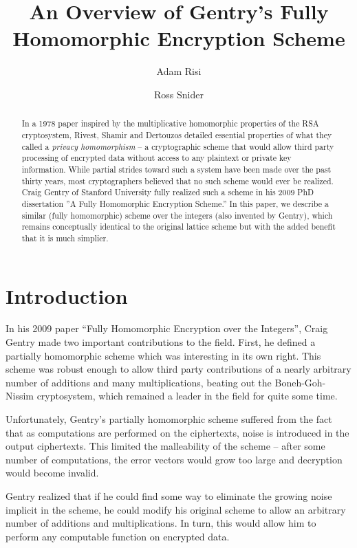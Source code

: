 \documentclass[a4paper,10pt]{article}
\title{An Overview of Gentry's Fully Homomorphic Encryption Scheme}
\author{Adam Risi \and Ross Snider}
\begin{document}
\maketitle
\titlepage
\tableofcontents
\pagebreak

\begin{abstract}
  In a 1978 paper\cite{rad-priv} inspired by the multiplicative
  homomorphic properties of the RSA cryptosystem, Rivest, Shamir and
  Dertouzos detailed essential properties of what they called a
  \textit{privacy homomorphism} -- a cryptographic scheme that would
  allow third party processing of encrypted data without access to any
  plaintext or private key information. While partial strides toward
  such a system have been made over the past thirty years, most
  cryptographers believed that no such scheme would ever be
  realized. Craig Gentry of Stanford University fully realized such a
  scheme in his 2009 PhD dissertation ''A Fully Homomorphic Encryption
  Scheme.''\cite{gentry-thesis} In this paper, we describe a similar
  (fully homomorphic) scheme over the integers (also invented by
  Gentry)\cite{gentry-integer}, which remains conceptually identical
  to the original lattice scheme but with the added benefit that it is
  much simplier.
\end{abstract}

\section{Introduction}
In his 2009 paper ``Fully Homomorphic Encryption over the
Integers''\cite{gentry-lattice}, Craig Gentry made two important
contributions to the field. First, he defined a partially homomorphic
scheme which was interesting in its own right. This scheme was robust
enough to allow third party contributions of a nearly arbitrary number
of additions and many multiplications, beating out the
Boneh-Goh-Nissim cryptosystem, which remained a leader in the field
for quite some time.

Unfortunately, Gentry's partially homomorphic scheme suffered from the
fact that as computations are performed on the ciphertexts, noise is
introduced in the output ciphertexts. This limited the malleability of
the scheme -- after some number of computations, the error vectors
would grow too large and decryption would become invalid.

Gentry realized that if he could find some way to eliminate the
growing noise implicit in the scheme, he could modify his original
scheme to allow an arbitrary number of additions and
multiplications. In turn, this would allow him to perform any
computable function on encrypted data.
\end{document}
